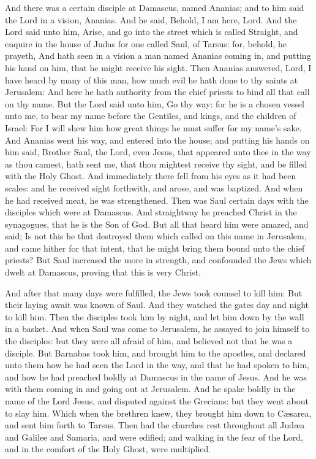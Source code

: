  And there was a certain disciple at Damascus, named
Ananias; and to him said the Lord in a vision, Ananias. And he said,
Behold, I am here, Lord.  And the Lord said unto him,
Arise, and go into the street which is called Straight, and enquire in
the house of Judas for one called Saul, of Tarsus: for, behold, he
prayeth,  And hath seen in a vision a man named Ananias
coming in, and putting his hand on him, that he might receive his sight.
 Then Ananias answered, Lord, I have heard by many of this
man, how much evil he hath done to thy saints at Jerusalem:
 And here he hath authority from the chief priests to bind
all that call on thy name.  But the Lord said unto him, Go
thy way: for he is a chosen vessel unto me, to bear my name before the
Gentiles, and kings, and the children of Israel:  For I
will shew him how great things he must suffer for my name's sake.
 And Ananias went his way, and entered into the house; and
putting his hands on him said, Brother Saul, the Lord, even Jesus, that
appeared unto thee in the way as thou camest, hath sent me, that thou
mightest receive thy sight, and be filled with the Holy Ghost.
 And immediately there fell from his eyes as it had been
scales: and he received sight forthwith, and arose, and was baptized.
 And when he had received meat, he was strengthened. Then
was Saul certain days with the disciples which were at Damascus.
 And straightway he preached Christ in the synagogues, that
he is the Son of God.  But all that heard him were amazed,
and said; Is not this he that destroyed them which called on this name
in Jerusalem, and came hither for that intent, that he might bring them
bound unto the chief priests?  But Saul increased the more
in strength, and confounded the Jews which dwelt at Damascus, proving
that this is very Christ.

 And after that many days were fulfilled, the Jews took
counsel to kill him:  But their laying await was known of
Saul. And they watched the gates day and night to kill him.
 Then the disciples took him by night, and let him down by
the wall in a basket.  And when Saul was come to Jerusalem,
he assayed to join himself to the disciples: but they were all afraid of
him, and believed not that he was a disciple.  But Barnabas
took him, and brought him to the apostles, and declared unto them how he
had seen the Lord in the way, and that he had spoken to him, and how he
had preached boldly at Damascus in the name of Jesus.  And
he was with them coming in and going out at Jerusalem.  And
he spake boldly in the name of the Lord Jesus, and disputed against the
Grecians: but they went about to slay him.  Which when the
brethren knew, they brought him down to Cæsarea, and sent him forth to
Tarsus.  Then had the churches rest throughout all Judæa
and Galilee and Samaria, and were edified; and walking in the fear of
the Lord, and in the comfort of the Holy Ghost, were multiplied.

